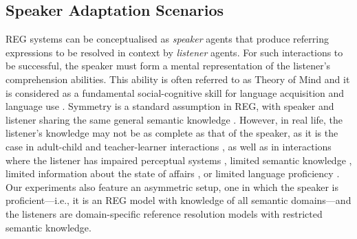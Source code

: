 \subsection{Speaker Adaptation Scenarios}
\label{sec:relwork-scenarios}
REG systems can be conceptualised as \textit{speaker} agents that produce referring expressions to be resolved in context by \textit{listener} agents. For such interactions to be successful, the speaker must form a mental representation of the listener's comprehension abilities. This ability is often referred to as Theory of Mind \cite[ToM;][]{premack1978tom} and it is considered as a fundamental social-cognitive skill for language acquisition and language use \cite{tomasello2005constructing}. 
Symmetry is a standard assumption in REG, with speaker and listener sharing the same general semantic knowledge \cite{mao2016generation,Yu2017AJS}. However, in real life, the listener's knowledge may not be as complete as that of the speaker, as it is the case in adult-child and teacher-learner interactions , 
as well as in interactions where the listener has impaired perceptual systems \cite{corona2019modeling}, limited semantic knowledge \citep{bao-etal-2022-learning}, limited information about the state of affairs \citep{bara-etal-2021-mindcraft}, or limited language proficiency \citep{zhu2021few}. Our experiments also feature an asymmetric setup, one in which the speaker is proficient---i.e., it is an REG model with knowledge of all semantic domains---and the listeners are domain-specific reference resolution models with restricted semantic knowledge.

